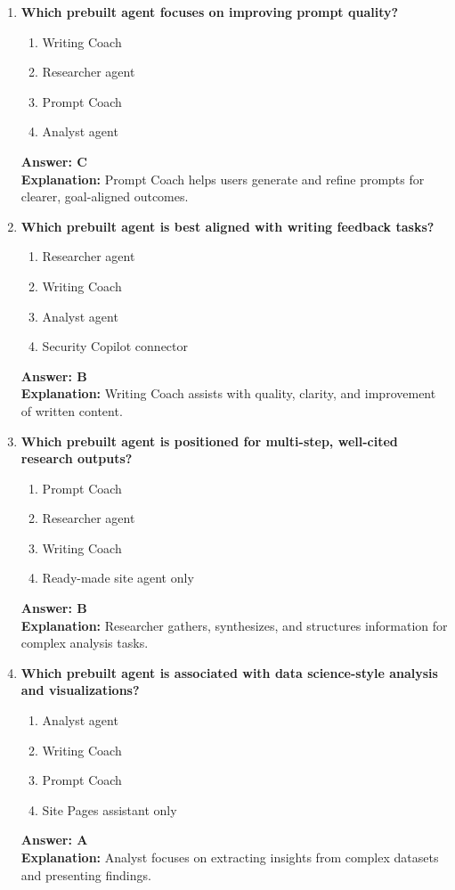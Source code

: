 \documentclass[10pt]{article}
\begin{document}
\begin{enumerate}[leftmargin=*]
\item \textbf{Which prebuilt agent focuses on improving prompt quality?}
\begin{enumerate}[label=\Alph*.]
  \item Writing Coach
  \item Researcher agent
  \item Prompt Coach
  \item Analyst agent
\end{enumerate}
\textbf{Answer: C}\\
\textbf{Explanation:} Prompt Coach helps users generate and refine prompts for clearer, goal-aligned outcomes.

\item \textbf{Which prebuilt agent is best aligned with writing feedback tasks?}
\begin{enumerate}[label=\Alph*.]
  \item Researcher agent
  \item Writing Coach
  \item Analyst agent
  \item Security Copilot connector
\end{enumerate}
\textbf{Answer: B}\\
\textbf{Explanation:} Writing Coach assists with quality, clarity, and improvement of written content.

\item \textbf{Which prebuilt agent is positioned for multi-step, well-cited research outputs?}
\begin{enumerate}[label=\Alph*.]
  \item Prompt Coach
  \item Researcher agent
  \item Writing Coach
  \item Ready-made site agent only
\end{enumerate}
\textbf{Answer: B}\\
\textbf{Explanation:} Researcher gathers, synthesizes, and structures information for complex analysis tasks.

\item \textbf{Which prebuilt agent is associated with data science-style analysis and visualizations?}
\begin{enumerate}[label=\Alph*.]
  \item Analyst agent
  \item Writing Coach
  \item Prompt Coach
  \item Site Pages assistant only
\end{enumerate}
\textbf{Answer: A}\\
\textbf{Explanation:} Analyst focuses on extracting insights from complex datasets and presenting findings.


\end{enumerate}
\end{document}
